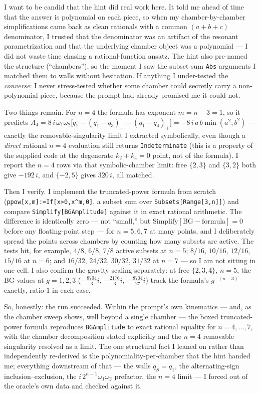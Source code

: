 \documentclass{article}
\begin{document}
I want to be candid that the hint did real work here. It told me ahead of time
that the answer is polynomial on each piece, so when my chamber-by-chamber
simplifications came back as clean rationals with a common $(a+b+c)$ denominator,
I trusted that the denominator was an artifact of the resonant parametrization
and that the underlying chamber object was a polynomial --- I did not waste time
chasing a rational-function ansatz. The hint also pre-named the structure
(``chambers''), so the moment I saw the subset-sum \texttt{Abs} arguments I
matched them to walls without hesitation. If anything I under-tested the
\emph{converse}: I never stress-tested whether some chamber could secretly carry a
non-polynomial piece, because the prompt had already promised me it could not.

Two things remain. For $n=4$ the formula has exponent $m=n-3=1$, so it predicts
$A_4=8\,i\,\omega_1\omega_2\big[q_1-(q_1-q_3)_+-(q_1-q_4)_+\big]
=-8\,i\,a\,b\min(a^2,b^2)$ --- exactly the removable-singularity limit I extracted
symbolically, even though a \emph{direct} rational $n=4$ evaluation still returns
\texttt{Indeterminate} (this is a property of the supplied code at the degenerate
$k_2+k_4=0$ point, not of the formula). I report the $n=4$ rows via that
symbolic-chamber limit: free $\{2,3\}$ and $\{3,2\}$ both give $-192\,i$, and
$\{-2,5\}$ gives $320\,i$, all matched.

Then I verify. I implement the truncated-power formula from scratch
(\texttt{ppow[x,m]:=If[x>0,x\^{}m,0]}, a subset sum over \texttt{Subsets[Range[3,n]]})
and compare \texttt{Simplify[BGAmplitude]} against it in exact rational
arithmetic. The difference is identically zero --- not ``small,'' but
$\mathrm{Simplify}[\text{BG}-\text{formula}]=0$ before any floating-point step ---
for $n=5,6,7$ at many points, and I deliberately spread the points across
chambers by counting how many subsets are active. The tests hit, for example,
$4/8$, $6/8$, $7/8$ active subsets at $n=5$; $8/16$, $10/16$, $12/16$, $15/16$ at
$n=6$; and $16/32$, $24/32$, $30/32$, $31/32$ at $n=7$ --- so I am not sitting in
one cell. I also confirm the gravity scaling separately: at free $\{2,3,4\}$,
$n=5$, the BG values at $g=1,2,3$ ($-\tfrac{8704}{3}i$, $-\tfrac{2176}{3}i$,
$-\tfrac{8704}{27}i$) track the formula's $g^{-(n-3)}$ exactly, ratio $1$ in each
case.

So, honestly: the run succeeded. Within the prompt's own kinematics --- and, as
the chamber sweep shows, well beyond a single chamber --- the boxed
truncated-power formula reproduces \texttt{BGAmplitude} to exact rational equality
for $n=4,\dots,7$, with the chamber decomposition stated explicitly and the $n=4$
removable singularity resolved as a limit. The one structural fact I leaned on
rather than independently re-derived is the polynomiality-per-chamber that the
hint handed me; everything downstream of that --- the walls $q_S=q_1$, the
alternating-sign inclusion--exclusion, the $i\,2^{n-1}\omega_1\omega_2$
prefactor, the $n=4$ limit --- I forced out of the oracle's own data and checked
against it.
\end{document}
